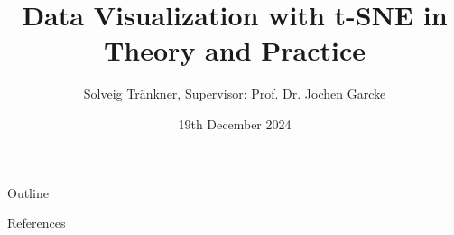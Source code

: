 \documentclass{beamer}[handout]
\title[Supervisor: Prof. Dr. Jochen Garcke]{Data Visualization with t-SNE in Theory and Practice}
\author[Author, I.]{Solveig Tr\"ankner, Supervisor: Prof. Dr. Jochen Garcke}
\date[Bachelor's thesis presentation]{19th December 2024}
\begin{document}
\begin{frame} 
    \titlepage


\end{frame}
\begin{frame}{Outline}
    \tableofcontents
\end{frame}

\begin{frame}[allowframebreaks]{References}
    \printbibliography
\end{frame}
 
\end{document}
